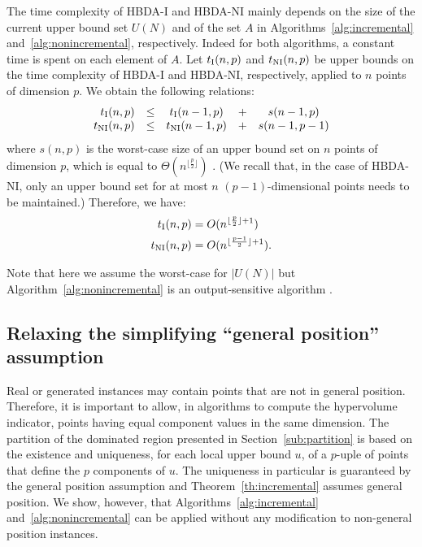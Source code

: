 \documentclass[a4paper,11pt]{article}
\begin{document}
The time complexity of HBDA-I and HBDA-NI 
mainly depends on the size of the current upper bound set $U(N)$ and of the set $A$
in Algorithms~\ref{alg:incremental} and~\ref{alg:nonincremental}, respectively.
Indeed for both algorithms, a constant time is spent on each element of $A$.
Let $t_{\rm I} (n, p)$ and $t_{\rm NI} (n, p)$ be upper bounds 
on the time complexity of HBDA-I and HBDA-NI,
respectively,
applied to $n$ points of dimension $p$.
We obtain the following relations:
$$\begin{array}{rcccc}
   t_{\rm I} (n, p)  & \leq & t_{\rm I} (n-1, p)  & + & s(n-1, p)\\
   t_{\rm NI} (n, p) & \leq & t_{\rm NI} (n-1, p) & + & s(n-1, p-1)\\
  \end{array}
$$
where $s(n,p)$ is the worst-case size of an upper bound set 
on $n$ points of dimension $p$, which is equal to $\Theta(n^{\lfloor \frac{p}{2} \rfloor})$ \citep{KapRubShaVer08}.
(We recall that, in the case of HBDA-NI, only an upper bound set 
for at most $n$ $(p-1)$-dimensional points needs to be maintained.)
Therefore, we have:
\begin{align*}
   t_{\rm I} (n, p)   & =  O(n^{\lfloor \frac{p}{2} \rfloor+1})\\
   t_{\rm NI} (n, p)  & =  O(n^{\lfloor \frac{p-1}{2} \rfloor+1}).\\
\end{align*}

Note that here we assume the worst-case for $|U(N)|$
but Algorithm~\ref{alg:nonincremental} is an output-sensitive algorithm \citep{KapRubShaVer08}.



\subsection{Relaxing the simplifying ``general position'' assumption}\label{sub:NGP}

Real or generated instances may contain points that are not in general position. 
Therefore, it is important to allow, in algorithms to compute the hypervolume indicator, 
points having equal component values in the same dimension.
The partition of the dominated region presented in Section~\ref{sub:partition}
is based on the existence and uniqueness, for each local upper bound $u$,
of a $p$-uple of points that define the $p$ components of $u$.
The uniqueness in particular is guaranteed by the general position assumption
and Theorem~\ref{th:incremental} assumes general position.
We show, however, that Algorithms~\ref{alg:incremental} and~\ref{alg:nonincremental}
can be applied without any modification to non-general position instances.
\end{document}
